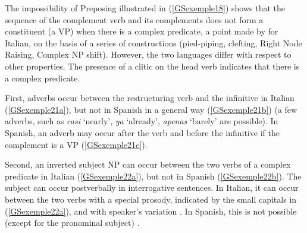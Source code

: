 \documentclass[output=paper
                ,modfonts
                ,nonflat
	        ,collection
	        ,collectionchapter
	        ,collectiontoclongg
 	        ,biblatex
                ,babelshorthands
                ,newtxmath
                ,draftmode
                ,colorlinks, citecolor=brown
]{./langsci/langscibook}
\begin{document}
{The impossibility of Preposing illustrated in (\ref{GSexemple18}) shows that the sequence of the complement verb and its complements does not form a constituent (a VP) when there is a complex predicate, a point made by \cite{rizzi1982issues} for Italian, on the basis of a series of constructions (pied-piping, clefting, Right Node Raising, Complex NP shift). However, the two languages differ with respect to other properties. The presence of a clitic on the head verb indicates that there is a complex predicate.
 
First, adverbs occur between the restructuring verb and the infinitive in Italian (\ref{GSexemple21a}), but not in Spanish in a general way (\ref{GSexemple21b}) (a few adverbs, such as \emph{casi} `nearly', \emph{ya} `already', \emph{apenas} `barely' are possible). In Spanish, an adverb may occur after the verb and before the infinitive if the complement is a VP (\ref{GSexemple21c}).

\eal
	\label{GSexemple21} 
	\label{GSexemple21a}

	\label{GSexemple21b}		
	
	\label{GSexemple21c}	
\zl

Second, an inverted subject NP can occur between the two verbs of a complex predicate in Italian (\ref{GSexemple22a}), but not in Spanish (\ref{GSexemple22b}). The subject can occur postverbally in interrogative sentences. In Italian, it can occur between the two verbs with a special prosody, indicated by the small capitals in (\ref{GSexemple22a}), and with speaker’s variation \citep{salvi1980ausiliari}. In Spanish, this is not possible (except for the pronominal subject) \citep{suner1982syntax}.

\eal
\judgewidth{\%}
	\label{GSexemple22} 
	\label{GSexemple22a}

}
\end{document}
